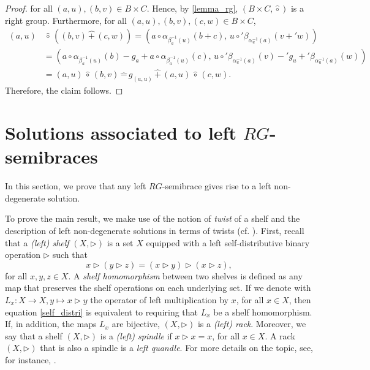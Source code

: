 \documentclass[11pt]{amsart}
\newcommand{\Aut}{\operatorname{Aut}}
\newcommand{\End}{\operatorname{End}}
\theoremstyle{definition}
\begin{document}
\begin{proof}
     for all $(a,u),(b,v)\in B\times C$. Hence, by \cref{lemma_rg}, $\left(B \times C, \hat{\circ}\right)$ is a right group.
Furthermore, for all $(a,u),(b,v),(c,w)\in B\times C$,
     \begin{align*}
         (a, u)&\,\hat{\circ}\, \left((b,v) \,\hat{+}\, (c,w)\right)
         = \left( a\circ\alpha_{\beta^{-1}_a(u)}(b+c),\, 
         u\circ'\beta_{\alpha^{-1}_u(a)}(v+'w) \right)\\
         &= \left( a\circ\alpha_{\beta^{-1}_a(u)}(b) - g_a + a \circ \alpha_{\beta^{-1}_a(u)}(c),\, 
         u\circ'\beta_{\alpha^{-1}_u(a)}(v) -' g_u +' \beta_{\alpha^{-1}_u(a)}(w) \right)\\
         &=(a, u) \,\hat{\circ}\, (b,v) \,\hat{-}\, g_{(a,u)} \,\hat{+}\, (a,u) \,\hat{\circ}\, (c,w).
     \end{align*}
     Therefore, the claim follows.
\end{proof}

\medskip

\section{Solutions associated to left \texorpdfstring{$RG$-}{-}semibraces}

In this section, we prove that any left $RG$-semibrace gives rise to a left non-degenerate solution. 

\smallskip


To prove the main result, we make use of the notion of \emph{twist} of a shelf %
 and the description of left non-degenerate solutions in terms of twists 
 (cf. \cite[Definition 2.14]{DoRySte24}). 
First, recall that a \emph{{\rm(}left{\rm)} shelf} $(X, \triangleright)$ is a set $X$ equipped with a left self-distributive binary operation $\triangleright$ such that
\begin{equation}\label{self_distri}
    x \triangleright (y \triangleright z)= (x \triangleright y) \triangleright (x \triangleright z), 
\end{equation} 
 for all $x,y,z\in X$. 
A \emph{shelf homomorphism} between two shelves is defined as any map that preserves the shelf operations on each underlying set.  
If we denote with $L_x:X \to X, y \mapsto x \triangleright y$ the operator of left multiplication by $x$, for all $x \in X$, then equation \eqref{self_distri} is equivalent to requiring that $L_x$ be a shelf homomorphism. If, in addition, the maps $L_x$ are bijective, $(X, \triangleright)$ is a \emph{(left) rack}. Moreover, we say that a shelf $(X, \triangleright)$ is a \emph{(left) spindle} if $x \triangleright x=x$, for all $x\in X$. A rack $(X, \triangleright)$ that is also a spindle is a \emph{left quandle}. For more details on the topic, see, for instance, \cite{FeSaFa04}. 
\end{document}
